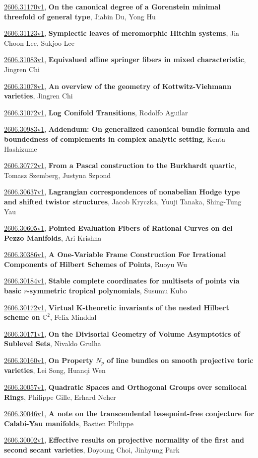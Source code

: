 \documentclass[9pt, a4paper]{article}
\theoremstyle{plain}
\theoremstyle{definition}
\theoremstyle{remark}
\newcommand{\arxiv}[3]{\href{https://arxiv.org/abs/#1}{#1}, \textbf{\textcolor{arxivblue}{#2}}, #3}
\begin{document}
\arxiv{2606.31170v1}{On the canonical degree of a Gorenstein minimal threefold of general type}{Jiabin Du, Yong Hu}

\arxiv{2606.31123v1}{Symplectic leaves of meromorphic Hitchin systems}{Jia Choon Lee, Sukjoo Lee}

\arxiv{2606.31083v1}{Equivalued affine springer fibers in mixed characteristic}{Jingren Chi}

\arxiv{2606.31078v1}{An overview of the geometry of Kottwitz-Viehmann varieties}{Jingren Chi}

\arxiv{2606.31072v1}{Log Conifold Transitions}{Rodolfo Aguilar}

\arxiv{2606.30983v1}{Addendum: On generalized canonical bundle formula and boundedness of complements in complex analytic setting}{Kenta Hashizume}

\arxiv{2606.30772v1}{From a Pascal construction to the Burkhardt quartic}{Tomasz Szemberg, Justyna Szpond}

\arxiv{2606.30637v1}{Lagrangian correspondences of nonabelian Hodge type and shifted twistor structures}{Jacob Kryczka, Yuuji Tanaka, Shing-Tung Yau}

\arxiv{2606.30605v1}{Pointed Evaluation Fibers of Rational Curves on del Pezzo Manifolds}{Ari Krishna}

\arxiv{2606.30386v1}{A One-Variable Frame Construction For Irrational Components of Hilbert Schemes of Points}{Ruoyu Wu}

\arxiv{2606.30184v1}{Stable complete coordinates for multisets of points via basic $r$-symmetric tropical polynomials}{Susumu Kubo}

\arxiv{2606.30172v1}{Virtual K-theoretic invariants of the nested Hilbert scheme on $\mathbb{C}^2$}{Felix Minddal}

\arxiv{2606.30171v1}{On the Divisorial Geometry of Volume Asymptotics of Sublevel Sets}{Nivaldo Grulha}

\arxiv{2606.30160v1}{On Property $N_p$ of line bundles on smooth projective toric varieties}{Lei Song, Huanqi Wen}

\arxiv{2606.30057v1}{Quadratic Spaces and Orthogonal Groups over semilocal Rings}{Philippe Gille, Erhard Neher}

\arxiv{2606.30046v1}{A note on the transcendental basepoint-free conjecture for Calabi-Yau manifolds}{Bastien Philippe}

\arxiv{2606.30002v1}{Effective results on projective normality of the first and second secant varieties}{Doyoung Choi, Jinhyung Park}
\end{document}
